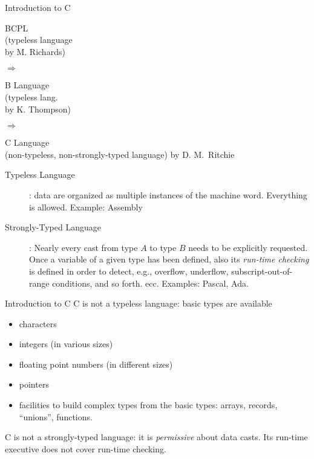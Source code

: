 \begin{frame}[fragile]{Introduction to C}
\parbox{1.0in}{BCPL \\ (typeless language\\by M. Richards)} $\Rightarrow$
\parbox{1.0in}{B Language \\ (typeless lang.\\
 by K.  Thompson)} $\Rightarrow$
\parbox{1.0in}{C Language\\ (non-typeless,
 non-strongly-typed
 language) by D. M.~Ritchie}

 \begin{description}
 \item[Typeless Language]: data are organized as multiple instances of the machine word.
 	Everything is allowed. Example: Assembly
 \item[Strongly-Typed Language]: Nearly every
 	cast from type
 $A$ to type $B$ needs to be explicitly requested. Once a variable of a given type
 has been defined, also its
 {\em run-time checking\/} is defined in order to detect, e.g., overflow, underflow,
 subscript-out-of-range conditions, and so forth.
 ecc.  Examples: Pascal, Ada.
 \end{description}


\end{frame}
\begin{frame}[fragile]{Introduction to C}
C is not a typeless language: basic types are available
\begin{itemize}\item characters\item integers (in various sizes)
\item floating point numbers (in different sizes)
\item pointers\item facilities to build complex types from the basic types:
arrays, records,
``unions'', functions.
\end{itemize}


\vspace{20pt}

C is not a strongly-typed language:
it is {\em permissive\/}
about data casts. Its run-time executive does not cover
run-time checking.


\end{frame}
